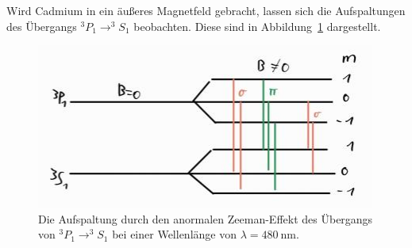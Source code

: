 Wird Cadmium in ein äußeres Magnetfeld gebracht, lassen sich die Aufspaltungen
des Übergangs $^{3}P_{1} \rightarrow ^{3}S_{1}$ beobachten. Diese sind in
Abbildung~\ref{fig:uebergang2} dargestellt.
\begin{figure}[H]
  \centering
  \includegraphics[scale=0.6]{pictures/aufspaltung_blau.png}
  \caption{Die Aufspaltung durch den anormalen Zeeman-Effekt des Übergangs
    von $^{3}P_{1} \rightarrow ^{3}S_{1}$ bei einer Wellenlänge von $\lambda = \SI{480}{\nano\meter}$.}
  \label{fig:uebergang2}
\end{figure}
\noindent
